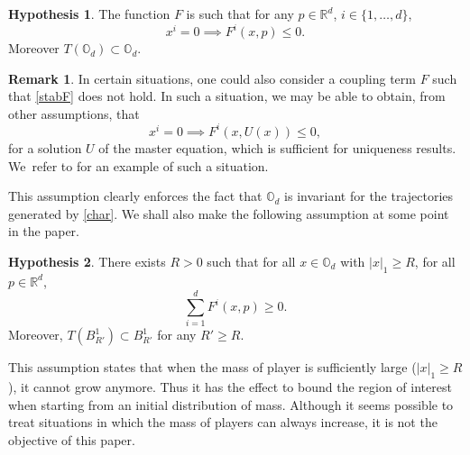 \documentclass[JEP,XML,SOM,Unicode,NoEqCountersInSection,published]{cedram}
\theoremstyle{definition}
\newtheorem{Rem}{Remark}[section]
\newtheorem{hyp}{Hypothesis}
\begin{document}
\begin{hyp}\label{stab}
The function $F$ is such that for any $p \in \mathbb{R}^d$, $i\in \{1,\dots,d\}$,
\begin{equation}\label{stabF}
x^i = 0 \implies F^i(x,p) \leq 0.
\end{equation}
Moreover $T(\mathbb{O}_d) \subset \mathbb{O}_d$.
\end{hyp}
\begin{Rem}
In certain situations, one could also consider a coupling term $F$ such that \eqref{stabF} does not hold. In such a situation, we may be able to obtain, from other assumptions, that
\begin{equation*}
x^i = 0 \implies F^i(x,U(x)) \leq 0,
\end{equation*}
for a solution $U$ of the master equation, which is sufficient for uniqueness results. We~refer to \cite{bertucci2020mean} for an example of such a situation.
\end{Rem}
This assumption clearly enforces the fact that $\mathbb{O}_d$ is invariant for the trajectories generated by \eqref{char}. We shall also make the following assumption at some point in the paper.
\begin{hyp}\label{grow}
There exists $R > 0$ such that for all $x \in \mathbb{O}_d$ with $|x|_1 \geq R$, for all $p \in \mathbb{R}^d$,
\begin{equation*}
\sum_{i = 1}^d F^i(x,p) \geq 0.
\end{equation*}
Moreover, $T(B^1_{R'}) \subset B^1_{R'}$ for any $R' \geq R$.
\end{hyp}
This assumption states that when the mass of player is sufficiently large ($|x|_1 \geq R$), it cannot grow anymore. Thus it has the effect to bound the region of interest when starting from an initial distribution of mass. Although it seems possible to treat situations in which the mass of players can always increase, it is not the objective of this paper.
\end{document}
